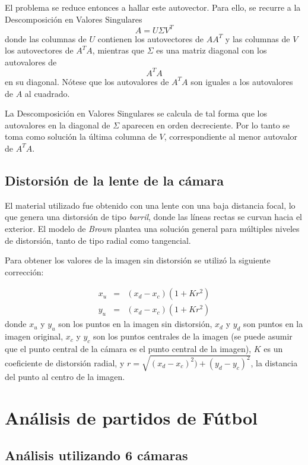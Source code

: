 El problema se reduce entonces a hallar este autovector. Para ello, se recurre a la Descomposición en Valores Singulares
\begin{equation}
    A = U\Sigma V^{T}
\end{equation}
donde las columnas de $U$ contienen los autovectores de $AA^{T}$ y las columnas de $V$ los autovectores de $A^{T}A$, mientras que $\Sigma$ es una matriz
diagonal con los autovalores de $$A^{T}A$$ en su diagonal. Nótese que los autovalores de $A^{T}A$ son iguales a los autovalores de $A$ al cuadrado.

La Descomposición en Valores Singulares se calcula de tal forma que los autovalores en la diagonal de $\Sigma$ aparecen en orden decreciente. Por lo tanto
se toma como solución la última columna de $V$, correspondiente al menor autovalor de $A^{T}A$.

\subsection{Distorsión de la lente de la cámara}

El material utilizado fue obtenido con una lente con una baja distancia focal,
lo que genera una distorsión de tipo \textit{barril}, donde las líneas rectas
se curvan hacia el exterior. El modelo de \textit{Brown} plantea una solución
general para múltiples niveles de distorsión, tanto de tipo radial como
tangencial.

Para obtener los valores de la imagen sin distorsión se utilizó la siguiente
corrección:

\begin{eqnarray*}
    x_u &=& (x_d - x_c) (1+K r^2) \\
    y_u &=& (x_d - x_c) (1+K r^2)
\end{eqnarray*}
donde $x_u$ y $y_u$ son los puntos en la imagen sin distorsión, $x_d$ y $y_d$ son
puntos en la imagen original, $x_c$ y $y_c$ son los puntos centrales de la
imagen (se puede asumir que el punto central de la cámara es el punto central
de la imagen), $K$ es un coeficiente de distorsión radial, y $r =
\sqrt{(x_d-x_c)^2) + (y_d-y_c)^2}$, la distancia del punto al centro de la
imagen.


\section{Análisis de partidos de Fútbol}
\label{sec:futbol}

\subsection{Análisis utilizando 6 cámaras}
\label{sec:6-camaras}

